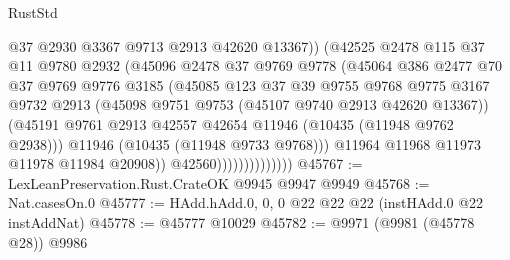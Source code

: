 \begin{lexlean}{RustStd}
\begin{coremodule}
                                  @37
                                  @2930
                                  @3367
                                  @9713
                                  @2913
                                  @42620
                                  @13367))
                              (@42525
                                @2478
                                @115
                                @37
                                @11
                                @9780
                                @2932
                                (@45096
                                  @2478
                                  @37
                                  @9769
                                  @9778
                                  (@45064
                                    @386
                                    @2477
                                    @70
                                    @37
                                    @9769
                                    @9776
                                    @3185
                                    (@45085
                                      @123
                                      @37
                                      @39
                                      @9755
                                      @9768
                                      @9775
                                      @3167
                                      @9732
                                      @2913
                                      (@45098 @9751 @9753 (@45107 @9740 @2913 @42620 @13367))
                                      (@45191
                                        @9761
                                        @2913
                                        @42557
                                        @42654
                                        @11946
                                        (@10435 (@11948 @9762 @2938)))
                                      @11946
                                      (@10435 (@11948 @9733 @9768)))
                                    @11964
                                    @11968
                                    @11973
                                    @11978
                                    @11984
                                    @20908))
                                @42560))))))))))))))
@45767 := LexLeanPreservation.Rust.CrateOK @9945 @9947 @9949
@45768 := Nat.casesOn.{0}
@45777 := HAdd.hAdd.{0, 0, 0} @22 @22 @22 (instHAdd.{0} @22 instAddNat)
@45778 := @45777 @10029
@45782 := @9971 (@9981 (@45778 @28)) @9986

\end{coremodule}
\end{lexlean}
